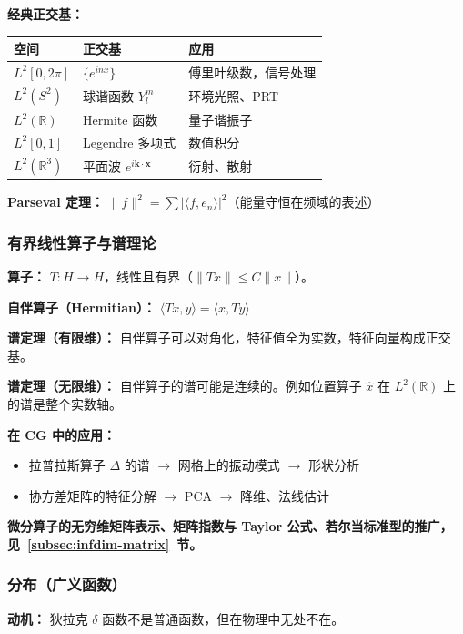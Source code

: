 \textbf{经典正交基：}
\begin{center}
\begin{tabular}{lll}
\toprule
\textbf{空间} & \textbf{正交基} & \textbf{应用} \\
\midrule
$L^2[0, 2\pi]$ & $\{e^{inx}\}$ & 傅里叶级数，信号处理 \\
$L^2(S^2)$ & 球谐函数 $Y_l^m$ & 环境光照、PRT \\
$L^2(\mathbb{R})$ & Hermite 函数 & 量子谐振子 \\
$L^2[0,1]$ & Legendre 多项式 & 数值积分 \\
$L^2(\mathbb{R}^3)$ & 平面波 $e^{i\mathbf{k}\cdot\mathbf{x}}$ & 衍射、散射 \\
\bottomrule
\end{tabular}
\end{center}

\textbf{Parseval 定理：} $\|f\|^2 = \sum |\langle f, e_n \rangle|^2$（能量守恒在频域的表述）

\subsubsection{有界线性算子与谱理论}
\label{subsec:spectral}

\textbf{算子：} $T: H \to H$，线性且有界（$\|Tx\| \leq C\|x\|$）。

\textbf{自伴算子（Hermitian）：} $\langle Tx, y \rangle = \langle x, Ty \rangle$

\textbf{谱定理（有限维）：} 自伴算子可以对角化，特征值全为实数，特征向量构成正交基。

\textbf{谱定理（无限维）：} 自伴算子的谱可能是连续的。例如位置算子 $\hat{x}$ 在 $L^2(\mathbb{R})$ 上的谱是整个实数轴。

\textbf{在 CG 中的应用：}
\begin{itemize}
  \item 拉普拉斯算子 $\Delta$ 的谱 $\to$ 网格上的振动模式 $\to$ 形状分析
  \item 协方差矩阵的特征分解 $\to$ PCA $\to$ 降维、法线估计
\end{itemize}

\textbf{微分算子的无穷维矩阵表示、矩阵指数与 Taylor 公式、若尔当标准型的推广，见~\ref{subsec:infdim-matrix}~节。}

\subsubsection{分布（广义函数）}

\textbf{动机：} 狄拉克 $\delta$ 函数不是普通函数，但在物理中无处不在。

